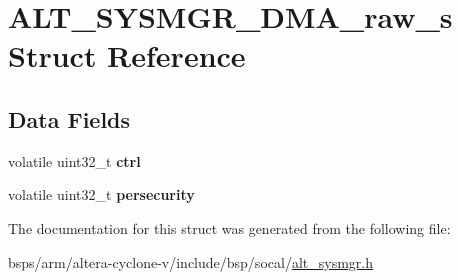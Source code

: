 \hypertarget{structALT__SYSMGR__DMA__raw__s}{}\section{A\+L\+T\+\_\+\+S\+Y\+S\+M\+G\+R\+\_\+\+D\+M\+A\+\_\+raw\+\_\+s Struct Reference}
\label{structALT__SYSMGR__DMA__raw__s}
\subsection*{Data Fields}
\begin{DoxyCompactItemize}
\item 
\mbox{\label{structALT__SYSMGR__DMA__raw__s_ae84c98e82bc86c0cf31932d9f919a88a}} 
volatile uint32\+\_\+t {\bfseries ctrl}
\item 
\mbox{\label{structALT__SYSMGR__DMA__raw__s_a8704b25f77c2e7ad59d30a5c8c41ed9a}} 
volatile uint32\+\_\+t {\bfseries persecurity}
\end{DoxyCompactItemize}


The documentation for this struct was generated from the following file\+:\begin{DoxyCompactItemize}
\item 
bsps/arm/altera-\/cyclone-\/v/include/bsp/socal/\mbox{\hyperlink{alt__sysmgr_8h}{alt\+\_\+sysmgr.\+h}}\end{DoxyCompactItemize}
